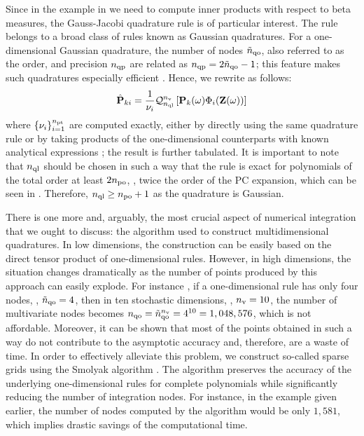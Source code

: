 Since in the example in  we need to compute inner products with respect to beta measures, the Gauss-Jacobi quadrature rule is of particular interest.
The rule belongs to a broad class of rules known as Gaussian quadratures.
For a one-dimensional Gaussian quadrature, the number of nodes ${\tilde{n}_\text{qo}}$, also referred to as the order, and precision ${n_\text{qp}}$ are related as ${n_\text{qp}} = 2 {\tilde{n}_\text{qo}} - 1$; this feature makes such quadratures especially efficient \cite{heiss2008}.
Hence, we rewrite  as follows:
\[
  \hat{\mathbf{P}}_{ki} = \frac{1}{\nu_i} \mathcal{Q}_{{n_\text{ql}}}^{{n_\text{v}}}\left[\mathbf{P}_k(\omega) \Phi_i(\mathbf{Z}(\omega))\right]
\]
where $\{ \nu_i \}_{i = 1}^{{n_\text{pt}}}$ are computed exactly, either by directly using the same quadrature rule or by taking products of the one-dimensional counterparts with known analytical expressions \cite{xiu2010}; the result is further tabulated.
It is important to note that ${n_\text{ql}}$ should be chosen in such a way that the rule is exact for polynomials of the total order at least $2 {n_\text{po}}$, \ie, twice the order of the PC expansion, which can be seen in  \cite{eldred2008}.
Therefore, ${n_\text{ql}} \geq {n_\text{po}} + 1$ as the quadrature is Gaussian.

There is one more and, arguably, the most crucial aspect of numerical integration that we ought to discuss: the algorithm used to construct multidimensional quadratures.
In low dimensions, the construction can be easily based on the direct tensor product of one-dimensional rules.
However, in high dimensions, the situation changes dramatically as the number of points produced by this approach can easily explode.
For instance \cite{heiss2008}, if a one-dimensional rule has only four nodes, \ie, ${\tilde{n}_\text{qo}} = 4$, then in ten stochastic dimensions, \ie, ${n_\text{v}} = 10$, the number of multivariate nodes becomes ${n_\text{qo}} = {\tilde{n}_\text{qo}}^{n_\text{v}} = 4^{10} = 1,048,576$, which is not affordable.
Moreover, it can be shown that most of the points obtained in such a way do not contribute to the asymptotic accuracy and, therefore, are a waste of time.
In order to effectively alleviate this problem, we construct so-called sparse grids using the Smolyak algorithm \cite{eldred2008, heiss2008, burkardt2013}.
The algorithm preserves the accuracy of the underlying one-dimensional rules for complete polynomials while significantly reducing the number of integration nodes.
For instance, in the example given earlier, the number of nodes computed by the algorithm would be only $1,581$, which implies drastic savings of the computational time.
